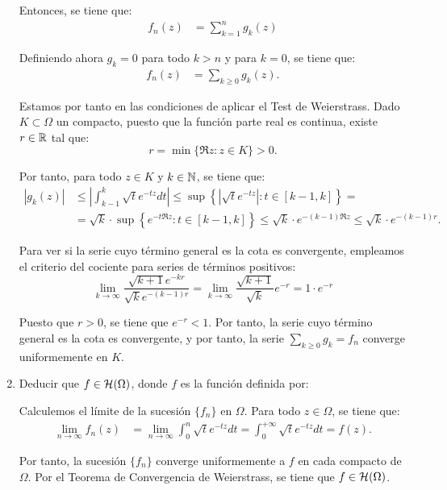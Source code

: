 \begin{ejercicio}
\begin{enumerate}
        Entonces, se tiene que:
        \begin{align*}
            f_n(z) &= \sum_{k=1}^n g_k(z)
        \end{align*}

        Definiendo ahora $g_k=0$ para todo $k>n$ y para $k=0$, se tiene que:
        \begin{align*}
            f_n(z) &= \sum_{k\geq 0} g_k(z).
        \end{align*}

        Estamos por tanto en las condiciones de aplicar el Test de Weierstrass. Dado $K\subset \Omega$ un compacto, puesto que la función parte real es continua, existe $r\in\mathbb{R}$ tal que:
        \[
        r= \min\{\Re z : z\in K\} > 0.
        \]

        Por tanto, para todo $z\in K$ y $k\in\mathbb{N}$, se tiene que:
        \begin{align*}
            \left|g_k(z)\right| &\leq \left|\int_{k-1}^k \sqrt{t} e^{-tz} dt\right| \leq \sup\left\{\left|\sqrt{t} e^{-tz}\right| : t\in [k-1,k]\right\}
            =\\&= \sqrt{k} \cdot \sup\left\{e^{-t\Re z} : t\in [k-1,k]\right\}
            \leq \sqrt{k} \cdot e^{-(k-1)\Re z}
            \leq \sqrt{k} \cdot e^{-(k-1)r}.
        \end{align*}

        Para ver si la serie cuyo término general es la cota es convergente, empleamos el criterio del cociente para series de términos positivos:
        \begin{equation*}
            \lim_{k\to\infty} \dfrac{\sqrt{k+1} e^{-kr}}{\sqrt{k} e^{-(k-1)r}} = \lim_{k\to\infty} \dfrac{\sqrt{k+1}}{\sqrt{k}} e^{-r} = 1\cdot e^{-r}
        \end{equation*}

        Puesto que $r>0$, se tiene que $e^{-r}<1$. Por tanto, la serie cuyo término general es la cota es convergente, y por tanto, la serie $\sum\limits_{k\geq 0} g_k=f_n$ converge uniformemente en $K$.


        \item Deducir que $f\in \mathcal{H}(\Omega)$, donde $f$ es la función definida por:

        Calculemos el límite de la sucesión $\{f_n\}$ en $\Omega$. Para todo $z\in\Omega$, se tiene que:
        \begin{align*}
            \lim_{n\to\infty} f_n(z) &= \lim_{n\to\infty} \int_0^n \sqrt{t} e^{-tz} dt
            = \int_0^{+\infty} \sqrt{t} e^{-tz} dt
            = f(z).
        \end{align*}

        Por tanto, la sucesión $\{f_n\}$ converge uniformemente a $f$ en cada compacto de $\Omega$. Por el Teorema de Convergencia de Weierstrass, se tiene que $f\in \mathcal{H}(\Omega)$.
    \end{enumerate}
\end{ejercicio}
